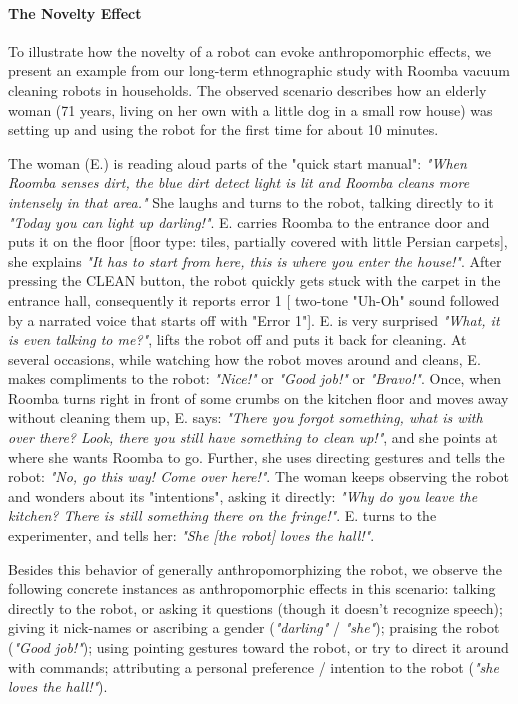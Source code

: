 \documentclass{frontiersSCNS} %
\begin{document}
\paragraph{The Novelty Effect}
\label{sec:noveltyeffect}

To illustrate how the novelty of a robot can evoke anthropomorphic effects, we
present an example from our long-term ethnographic study with Roomba vacuum
cleaning robots in households. The observed scenario describes how an elderly
woman (71 years, living on her own with a little dog in a small row house) was
setting up and using the robot for the first time for about 10 minutes.

The woman (E.) is reading aloud parts of the "quick start manual": \emph{"When
Roomba senses dirt, the blue dirt detect light is lit and Roomba cleans more
intensely in that area."} She laughs and turns to the robot, talking directly to
it \emph{"Today you can light up darling!"}. E. carries Roomba to the entrance
door and puts it on the floor [floor type: tiles, partially covered with little
Persian carpets], she explains \emph{"It has to start from here, this is where
you enter the house!"}. After pressing the CLEAN button, the robot quickly gets
stuck with the carpet in the entrance hall, consequently it reports error 1 [
two-tone "Uh-Oh" sound followed by a narrated voice that starts off with "Error
1"]. E. is very surprised \emph{"What, it is even talking to me?"}, lifts the
robot off and puts it back for cleaning. At several occasions, while watching
how the robot moves around and cleans, E. makes compliments to the robot:
\emph{"Nice!"} or \emph{"Good job!"} or \emph{"Bravo!"}. Once, when Roomba turns
right in front of some crumbs on the kitchen floor and moves away without
cleaning them up, E. says: \emph{"There you forgot something, what is with over
there? Look, there you still have something to clean up!"}, and she points at
where she wants Roomba to go. Further, she uses directing gestures and tells the
robot: \emph{"No, go this way! Come over here!"}. The woman keeps observing the
robot and wonders about its "intentions", asking it directly: \emph{"Why do you
leave the kitchen? There is still something there on the fringe!"}. E. turns to
the experimenter, and tells her: \emph{"She [the robot] loves the hall!"}.

Besides this behavior of generally anthropomorphizing the robot, we observe the
following concrete instances as anthropomorphic effects in this scenario:
talking directly to the robot, or asking it questions (though it doesn't
recognize speech); giving it nick-names or ascribing a gender (\emph{"darling"}
/ \emph{"she"}); praising the robot (\emph{"Good job!"}); using pointing
gestures toward the robot, or try to direct it around with commands; attributing
a personal preference / intention to the robot (\emph{"she loves the hall!"}).
\end{document}
